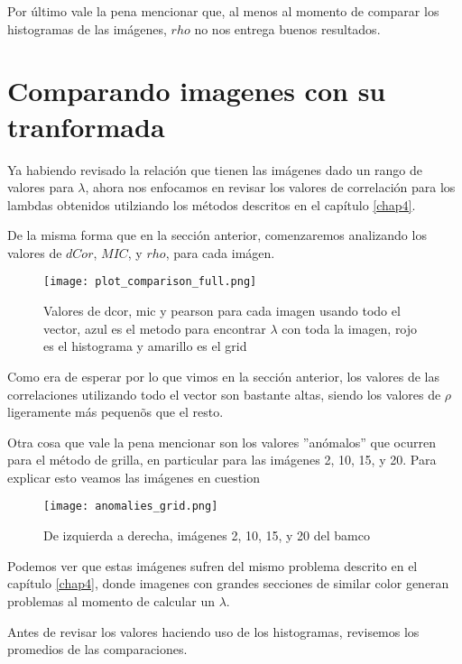         Por \'ultimo vale la pena mencionar que, al menos al momento de comparar los histogramas de las im\'agenes, $rho$ no nos entrega buenos resultados. 


\section{Comparando imagenes con su tranformada}

    Ya habiendo revisado la relaci\'on que tienen las im\'agenes dado un rango de valores para $\lambda$, ahora nos enfocamos en revisar los valores de correlaci\'on para los lambdas obtenidos utilziando los m\'etodos descritos en el cap\'itulo \ref{chap4}. 
    
    De la misma forma que en la secci\'on anterior, comenzaremos analizando los valores de $dCor$, $MIC$, y $rho$, para cada im\'agen.
    
    \begin{figure}[H]
        \centering
        \texttt{[image: plot\_comparison\_full.png]}
        \caption{Valores de dcor, mic y pearson para cada imagen usando todo el vector, azul es el metodo para encontrar $\lambda$ con toda la imagen, rojo es el histograma y amarillo es el grid}
    \end{figure}

    Como era de esperar por lo que vimos en la secci\'on anterior, los valores de las correlaciones utilizando todo el vector son bastante altas, siendo los valores de $\rho$ ligeramente m\'as pequen\~os que el resto. 

    Otra cosa que vale la pena mencionar son los valores ''an\'omalos'' que ocurren para el m\'etodo de grilla, en particular para las im\'agenes 2, 10, 15, y 20. Para explicar esto veamos las im\'agenes en cuestion

    \begin{figure}[H]
        \centering
        \texttt{[image: anomalies\_grid.png]}
        \caption{De izquierda a derecha, im\'agenes 2, 10, 15, y 20 del bamco \cite{KodakLosslessTrueColorImageSuite}}
    \end{figure}

    Podemos ver que estas im\'agenes sufren del mismo problema descrito en el cap\'itulo \ref{chap4}, donde imagenes con grandes secciones de similar color generan problemas al momento de calcular un $\lambda$.

    Antes de revisar los valores haciendo uso de los histogramas, revisemos los promedios de las comparaciones. 


